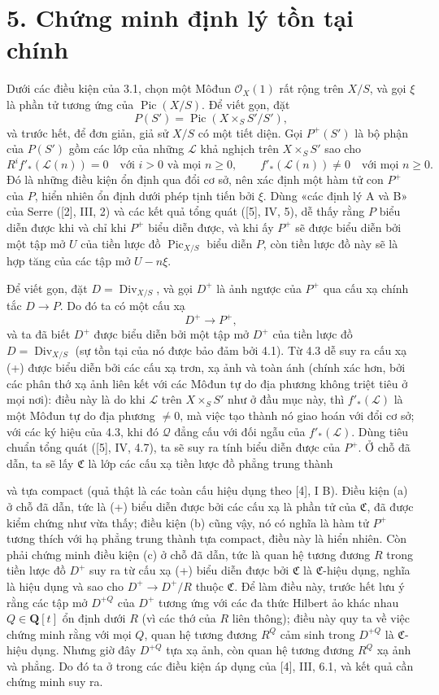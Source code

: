 \documentclass[11pt,twoside,openany]{book}
\numberwithin{equation}{section}
\newcommand{\src}[1]{%
  \phantomsection\hypertarget{src:\fgasourceid:#1}{}%
  \marginpar{\raggedleft\footnotesize\sffamily #1}%
}
\newcommand{\fgasourceid}{unset}
\newcommand{\fsection}[2]{%
  \section*{#1. #2}%
  \addcontentsline{toc}{section}{#1. #2}%
}
\begin{document}
\fsection{5}{Chứng minh định lý tồn tại chính}

Dưới các điều kiện của 3.1, chọn một Môđun $\mathcal O_X(1)$ rất rộng trên
$X/S$, và gọi $\xi$ là phần tử tương ứng của $\operatorname{Pic}(X/S)$. Để
viết gọn, đặt
\[
P(S')=\operatorname{Pic}(X\times_SS'/S'),
\]
và trước hết, để đơn giản, giả sử $X/S$ có một tiết diện. Gọi $P^+(S')$ là bộ
phận của $P(S')$ gồm các lớp của những $\mathcal L$ khả nghịch trên
$X\times_SS'$ sao cho
\[
R^if'_*(\mathcal L(n))=0\quad\text{với $i>0$ và mọi $n\geq0$},
\qquad
f'_*(\mathcal L(n))\neq0\quad\text{với mọi $n\geq0$}.
\]
Đó là những điều kiện ổn định qua đổi cơ sở, nên xác định một hàm tử con
$P^+$ của $P$, hiển nhiên ổn định dưới phép tịnh tiến bởi $\xi$. Dùng «các
định lý A và B» của Serre ([2], III, 2) và các kết quả tổng quát ([5], IV, 5),
dễ thấy rằng $P$ biểu diễn được khi và chỉ khi $P^+$ biểu diễn được, và khi ấy
$P^+$ sẽ được biểu diễn bởi một tập mở $U$ của tiền lược đồ
$\operatorname{Pic}_{X/S}$ biểu diễn $P$, còn tiền lược đồ này sẽ là hợp tăng
của các tập mở $U-n\xi$.

Để viết gọn, đặt $D=\operatorname{Div}_{X/S}$, và gọi $D^+$ là ảnh ngược của
$P^+$ qua cấu xạ chính tắc $D\longrightarrow P$. Do đó ta có một cấu xạ
\begin{equation}
D^+\longrightarrow P^+,
\tag{+}
\end{equation}
và ta đã biết $D^+$ được biểu diễn bởi một tập mở $D^+$ của tiền lược đồ
$D=\operatorname{Div}_{X/S}$ (sự tồn tại của nó được bảo đảm bởi 4.1). Từ 4.3
dễ suy ra cấu xạ (+) được biểu diễn bởi các cấu xạ trơn, xạ ảnh và toàn ánh
(chính xác hơn, bởi các phân thớ xạ ảnh liên kết với các Môđun tự do địa
phương không triệt tiêu ở mọi nơi): điều này là do khi $\mathcal L$ trên
$X\times_SS'$ như ở đầu mục này, thì $f'_*(\mathcal L)$ là một Môđun tự do
địa phương $\neq0$, mà việc tạo thành nó giao hoán với đổi cơ sở; với các ký
hiệu của 4.3, khi đó $\mathcal Q$ đẳng cấu với đối ngẫu của
$f'_*(\mathcal L)$. Dùng tiêu chuẩn tổng quát ([5], IV, 4.7), ta sẽ suy ra
tính biểu diễn được của $P^+$. Ở chỗ đã dẫn, ta sẽ lấy $\mathfrak C$ là lớp
các cấu xạ tiền lược đồ phẳng trung thành
\src{155}
và tựa compact (quả thật là các toàn cấu hiệu dụng theo [4], I B). Điều kiện
(a) ở chỗ đã dẫn, tức là (+) biểu diễn được bởi các cấu xạ là phần tử của
$\mathfrak C$, đã được kiểm chứng như vừa thấy; điều kiện (b) cũng vậy, nó có
nghĩa là hàm tử $P^+$ tương thích với hạ phẳng trung thành tựa compact, điều
này là hiển nhiên. Còn phải chứng minh điều kiện (c) ở chỗ đã dẫn, tức là quan
hệ tương đương $R$ trong tiền lược đồ $D^+$ suy ra từ cấu xạ (+) biểu diễn được
bởi $\mathfrak C$ là $\mathfrak C$-hiệu dụng, nghĩa là hiệu dụng và sao cho
$D^+\longrightarrow D^+/R$ thuộc $\mathfrak C$. Để làm điều này, trước hết
lưu ý rằng các tập mở $D^{+Q}$ của $D^+$ tương ứng với các đa thức Hilbert ảo
khác nhau $Q\in\mathbf Q[t]$ ổn định dưới $R$ (vì các thớ của $R$ liên thông);
điều này quy ta về việc chứng minh rằng với mọi $Q$, quan hệ tương đương $R^Q$
cảm sinh trong $D^{+Q}$ là $\mathfrak C$-hiệu dụng. Nhưng giờ đây $D^{+Q}$ tựa
xạ ảnh, còn quan hệ tương đương $R^Q$ xạ ảnh và phẳng. Do đó ta ở trong các
điều kiện áp dụng của [4], III, 6.1, và kết quả cần chứng minh suy ra.
\end{document}

